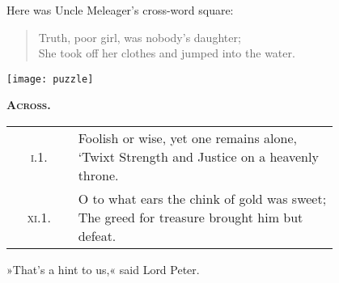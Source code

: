 \vfill

Here was Uncle Meleager's cross-word square:

\begin{quote}
Truth, poor girl, was nobody's daughter;\\
She took off her clothes and jumped into the water.\\
\end{quote}

\begin{center}
\texttt{[image: puzzle]}
\end{center}

\pagebreak[2]

{\scshape\large\bfseries Across.}

\def\arraystretch{2.5}
	
\begin{longtable} {c p{0.8\linewidth}} 
\textsc{i}.1. & \makecell[l]{Foolish or wise, yet one remains alone,\\`Twixt Strength and Justice on a heavenly throne.}\\
\textsc{xi}.1. & \makecell[l]{O to what ears the chink of gold was sweet;\\
The greed for treasure brought him but defeat.}\\
\end{longtable}

»That's a hint to us,« said Lord Peter.

